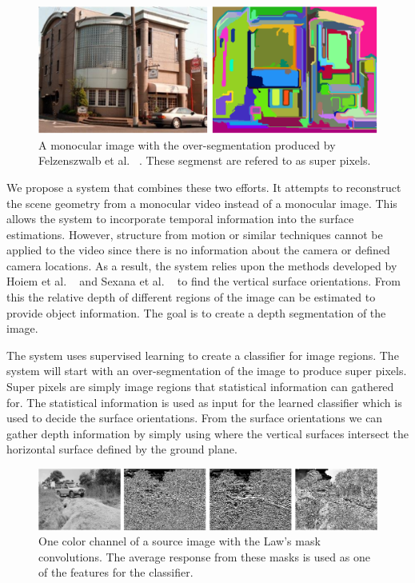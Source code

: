 \documentclass[times,10pt,twocolumn]{article}
\begin{document}
\begin{figure}[t]
  \includegraphics[keepaspectratio=true, width=\linewidth]{segment.eps}
  \caption{A monocular image with the over-segmentation produced by
           Felzenszwalb et al. ~\cite{Felzen}. These segmenst are refered to as
           super pixels.}
  \label{fig:superpixel}
\end{figure}

We propose a system that combines these two efforts. It attempts to reconstruct
the scene geometry from a monocular video instead of a monocular image. This
allows the system to incorporate temporal information into the surface
estimations. However, structure from motion or similar techniques cannot be
applied to the video since there is no information about the camera or defined
camera locations. As a result, the system relies upon the methods developed by
Hoiem et al. ~\cite{Hoiem-05} and Sexana et al. ~\cite{Sexana} to find the
vertical surface orientations. From this the relative depth of different
regions of the image can be estimated to provide object information. The goal
is to create a depth segmentation of the image.

The system uses supervised learning to create a classifier for image regions.
The system will start with an over-segmentation of the image to produce super
pixels. Super pixels are simply image regions that statistical information can
gathered for. The statistical information is used as input for the learned
classifier which is used to decide the surface orientations. From the surface
orientations we can gather depth information by simply using where the vertical
surfaces intersect the horizontal surface defined by the ground plane.


\begin{figure}[t]
  \includegraphics[keepaspectratio=true, width=\textwidth]{Laws.eps}
  \caption{One color channel of a source image with the Law's mask
           convolutions. The average response from these masks is used
           as one of the features for the classifier.}
  \label{fig:lawsconv}
\end{figure}
\end{document}
